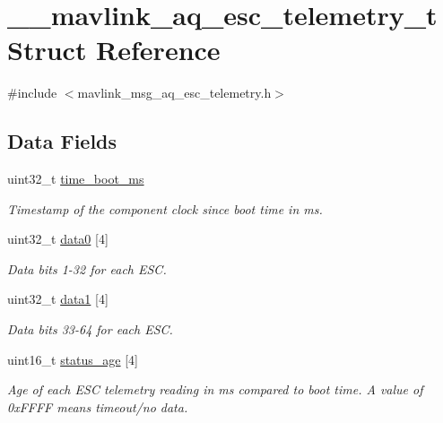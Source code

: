 \hypertarget{struct____mavlink__aq__esc__telemetry__t}{\section{\+\_\+\+\_\+mavlink\+\_\+aq\+\_\+esc\+\_\+telemetry\+\_\+t Struct Reference}
\label{struct____mavlink__aq__esc__telemetry__t}
}


{\ttfamily \#include $<$mavlink\+\_\+msg\+\_\+aq\+\_\+esc\+\_\+telemetry.\+h$>$}

\subsection*{Data Fields}
\begin{DoxyCompactItemize}
\item 
uint32\+\_\+t \hyperlink{struct____mavlink__aq__esc__telemetry__t_a92808787ccaee816434034999e24e2b1}{time\+\_\+boot\+\_\+ms}
\begin{DoxyCompactList}\small\item\em Timestamp of the component clock since boot time in ms. \end{DoxyCompactList}\item 
uint32\+\_\+t \hyperlink{struct____mavlink__aq__esc__telemetry__t_ad6b56c43abdf775da1a02ad64ca54776}{data0} \mbox{[}4\mbox{]}
\begin{DoxyCompactList}\small\item\em Data bits 1-\/32 for each E\+S\+C. \end{DoxyCompactList}\item 
uint32\+\_\+t \hyperlink{struct____mavlink__aq__esc__telemetry__t_af3fc0abe528e3ed92bb40eedf39466ac}{data1} \mbox{[}4\mbox{]}
\begin{DoxyCompactList}\small\item\em Data bits 33-\/64 for each E\+S\+C. \end{DoxyCompactList}\item 
uint16\+\_\+t \hyperlink{struct____mavlink__aq__esc__telemetry__t_a7ce9cc1ba54e799951b6f57cba3e1874}{status\+\_\+age} \mbox{[}4\mbox{]}
\begin{DoxyCompactList}\small\item\em Age of each E\+S\+C telemetry reading in ms compared to boot time. A value of 0x\+F\+F\+F\+F means timeout/no data. \end{DoxyCompactList}\item 

\end{DoxyCompactItemize}
